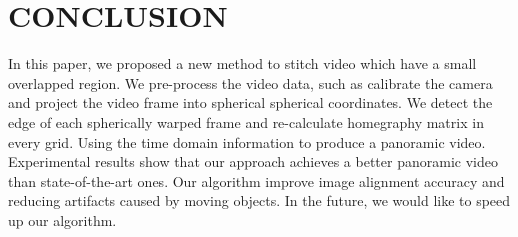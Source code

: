 \documentclass[conference]{IEEEtran}
\begin{document}
\section{CONCLUSION}
\label{sec:conclusion}

In this paper, we proposed a new method to stitch video which have a small overlapped region. We pre-process the video data, such as calibrate the camera and project the video frame into spherical
spherical coordinates. We detect the edge of each spherically warped frame and re-calculate homegraphy matrix in every grid. Using the time domain information to produce a panoramic video. 
Experimental results show that our approach achieves a better panoramic video than state-of-the-art ones. Our algorithm improve image alignment accuracy and reducing artifacts caused by
moving objects. In the future, we would like to speed up our algorithm.
\end{document}
